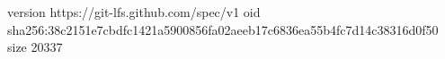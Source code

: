 version https://git-lfs.github.com/spec/v1
oid sha256:38c2151e7cbdfc1421a5900856fa02aeeb17c6836ea55b4fc7d14c38316d0f50
size 20337

